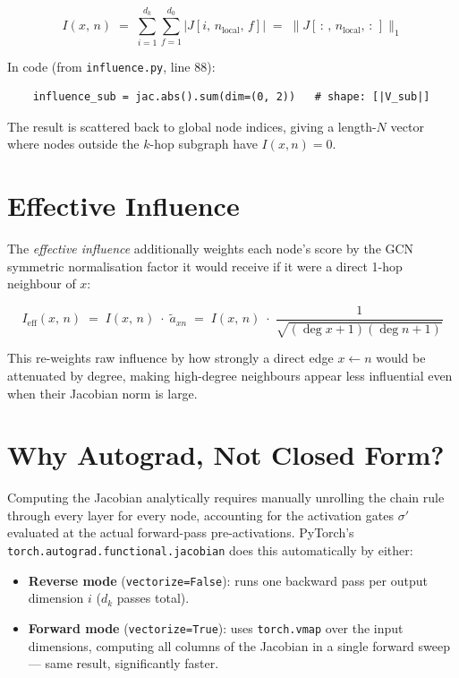 \documentclass[11pt]{article}
\begin{document}
\begin{equation}
  I(x,\, n)
  \;=\;
  \sum_{i=1}^{d_k}\sum_{f=1}^{d_0}
  \bigl|J[i,\, n_\text{local},\, f]\bigr|
  \;=\;
  \bigl\|J[\,:\,,\, n_\text{local},\, :\,]\bigr\|_1
\end{equation}

In code (from \texttt{influence.py}, line 88):
\begin{verbatim}
    influence_sub = jac.abs().sum(dim=(0, 2))   # shape: [|V_sub|]
\end{verbatim}

The result is scattered back to global node indices, giving a length-$N$
vector where nodes outside the $k$-hop subgraph have $I(x, n) = 0$.

\section{Effective Influence}

The \emph{effective influence} additionally weights each node's score by
the GCN symmetric normalisation factor it would receive if it were a direct
1-hop neighbour of $x$:

\begin{equation}
  I_\text{eff}(x,\, n)
  \;=\;
  I(x,\, n)
  \;\cdot\;
  \tilde{a}_{xn}
  \;=\;
  I(x,\, n)
  \;\cdot\;
  \frac{1}{\sqrt{(\deg x + 1)(\deg n + 1)}}
\end{equation}

This re-weights raw influence by how strongly a direct edge $x \leftarrow n$
would be attenuated by degree, making high-degree neighbours appear less
influential even when their Jacobian norm is large.

\section{Why Autograd, Not Closed Form?}

Computing the Jacobian analytically requires manually unrolling the chain
rule through every layer for every node, accounting for the activation gates
$\sigma'$ evaluated at the actual forward-pass pre-activations. PyTorch's
\texttt{torch.autograd.functional.jacobian} does this automatically by
either:

\begin{itemize}[leftmargin=1.5em]
  \item \textbf{Reverse mode} (\texttt{vectorize=False}): runs one backward
    pass per output dimension $i$ ($d_k$ passes total).
  \item \textbf{Forward mode} (\texttt{vectorize=True}): uses
    \texttt{torch.vmap} over the input dimensions, computing all columns of
    the Jacobian in a single forward sweep — same result, significantly
    faster.
\end{itemize}
\end{document}
